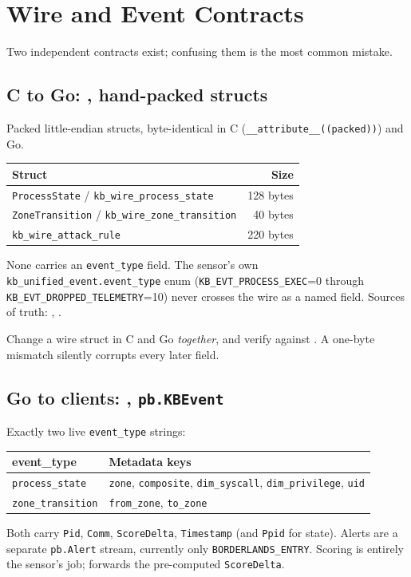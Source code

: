 \appendix
\chapter{Wire and Event Contracts}
\label{app:wire}
Two independent contracts exist; confusing them is the most common mistake.
\section{C to Go: , hand-packed structs}
Packed little-endian structs, byte-identical in C (\texttt{\_\_attribute\_\_((packed))}) and Go.
\begin{center}\small
\begin{tabular}{@{}lr@{}}
\toprule \textbf{Struct} & \textbf{Size}\\ \midrule
\texttt{ProcessState} / \texttt{kb\_wire\_process\_state} & 128 bytes\\
\texttt{ZoneTransition} / \texttt{kb\_wire\_zone\_transition} & 40 bytes\\
\texttt{kb\_wire\_attack\_rule} & 220 bytes\\
\bottomrule
\end{tabular}
\end{center}
None carries an \texttt{event\_type} field. The sensor's own \texttt{kb\_unified\_event.event\_type} enum
(\texttt{KB\_EVT\_PROCESS\_EXEC}=0 through \texttt{KB\_EVT\_DROPPED\_TELEMETRY}=10) never crosses the wire as a named
field. Sources of truth: , .
\begin{kbwarn}
Change a wire struct in C and Go \emph{together}, and verify against .
A one-byte mismatch silently corrupts every later field.
\end{kbwarn}
\section{Go to clients: , \texttt{pb.KBEvent}}
Exactly two live \texttt{event\_type} strings:
\begin{center}\small
\begin{tabularx}{\textwidth}{@{}L{3.3cm}Y@{}}
\toprule \textbf{event\_type} & \textbf{Metadata keys}\\ \midrule
\texttt{process\_state} & \texttt{zone}, \texttt{composite}, \texttt{dim\_syscall}, \texttt{dim\_privilege}, \texttt{uid}\\
\texttt{zone\_transition} & \texttt{from\_zone}, \texttt{to\_zone}\\
\bottomrule
\end{tabularx}
\end{center}
Both carry \texttt{Pid}, \texttt{Comm}, \texttt{ScoreDelta}, \texttt{Timestamp} (and \texttt{Ppid} for state). Alerts are a separate
\texttt{pb.Alert} stream, currently only \texttt{BORDERLANDS\_ENTRY}. Scoring is entirely the sensor's job; 
forwards the pre-computed \texttt{ScoreDelta}.

